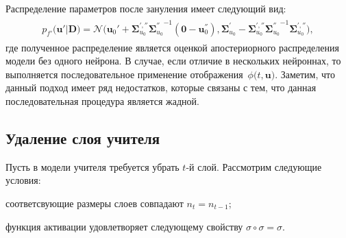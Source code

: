 \documentclass[12pt]{a&t}
\begin{document}
Распределение параметров после зануления имеет следующий вид:
\begin{gather}
\label{eq:ap:3}
\begin{aligned}
p_{f'}\bigr(\mathbf{u}'|\mathbf{D}\bigr) = \mathcal{N}\bigr(\mathbf{u}_{0}'+\bm{\Sigma}_{u_0}^{', ''}{\bm{\Sigma}_{u_0}^{''}}^{-1}\left(\mathbf{0} - \mathbf{u}_0^{''}\right), \bm{\Sigma}_{u_0}^{'}-\bm{\Sigma}_{u_0}^{', ''}{\bm{\Sigma}_{u_0}^{''}}^{-1}\bm{\Sigma}_{u_0}^{', ''}\bigr),
\end{aligned}
\end{gather}
где полученное распределение является оценкой апостериорного распределения модели без одного нейрона. В случае, если отличие в нескольких нейроннах, то выполняется последовательное применение отображения~$\phi\bigr(t, \mathbf{u}\bigr)$. Заметим, что данный подход имеет ряд недостатков, которые связаны с тем, что данная последовательная процедура является жадной.

\subsection{Удаление слоя учителя}
Пусть в модели учителя требуется убрать $t$-й слой. Рассмотрим следующие условия:
\begin{enumlist}
    \item соответсвующие размеры слоев совпадают $n_t=n_{t-1}$;
    \item функция активации удовлетворяет следующему свойству $\sigma \circ \sigma = \sigma$.
\end{enumlist}
\end{document}
